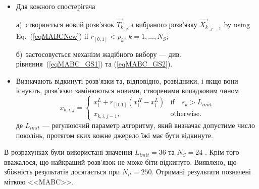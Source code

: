 \begin{itemize}
 \item Для кожного спостерігача

 а)~створюється новий розв'язок $\overrightarrow{T_{k}}_{,j}$ з вибраного розв'язку
$\overrightarrow{X_{k}}_{,j-1}$ by using Eq.~(\ref{eqMABCNew}) if $r_{[0,1]}<p_k$, $k={1,\ldots,N_S}$;

 б)~застосовується механізм жадібного вибору --- див. рівняння~(\ref{eqMABC_GS1}) та (\ref{eqMABC_GS2}).

 \item
 Визначають відкинуті розв'язки та, відповідно, розвідники, і якщо вони існують, розв'язки замінюються новими, створеними випадковим чином
  \begin{equation}
 \label{eqMABCSC}
 x_{k,i,j}=\left\{
 \begin{array}{ll}
 x_i^L+r_{[0,1]}(x_i^H-x_i^L) & \text{if} \quad s_k>L_{imit}
 \\
 x_{k,i,j-1},& \text{otherwise}.
 \end{array}
 \right.
 \end{equation}
 де
 $L_{imit}$ --- регулюючий параметр алгоритму, який визначає допустиме число поколінь, протягом яких кожне джерело їжі має бути відкинуте.
\end{itemize}

В розрахунках були використані значення $L_{imit}=36$ та $N_S=24$ \cite{MABC}.
Крім того вважалося, що найкращий розв'язок не може біти відкинуто.
Виявлено, що збіжність результатів досягається при $N_{it}=250$.
Отримані результати позначені міткою <<MABC>>.

